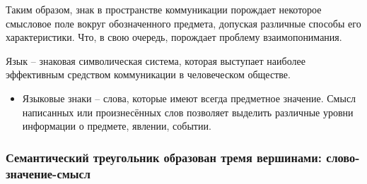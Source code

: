 \documentclass[main.tex]{subfiles}
\begin{document}
{\parindent0pt
Таким образом, знак в пространстве коммуникации порождает некоторое смысловое поле вокруг обозначенного предмета, допуская различные способы его характеристики.
Что, в свою очередь, порождает проблему взаимопонимания.
}
\ \\

{\parindent0pt
Язык -- знаковая символическая система, которая выступает наиболее эффективным средством коммуникации в человеческом обществе.
\begin{itemize}[nosep,leftmargin=0.5cm]
\item Языковые знаки -- слова, которые имеют всегда предметное значение.
Смысл написанных или произнесённых слов позволяет выделить различные уровни информации о предмете, явлении, событии.
\end{itemize}
}



\subsubsection{Семантический треугольник образован тремя вершинами: слово-значение-смысл}
\end{document}
